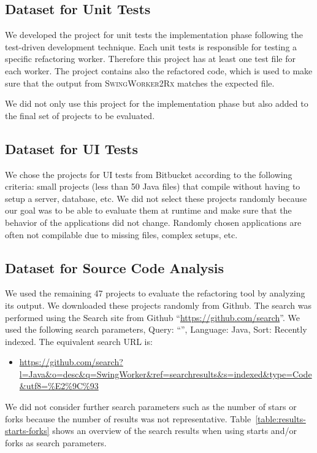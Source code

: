 \documentclass[type=bsc,accentcolor=tud9c]{tudthesis}
\newcommand{\framework}[1]{\textcolor{black!65}{#1}}
\newcommand{\toolextension}{\textsc{SwingWorker2Rx}}
\begin{document}
\subsection{Dataset for Unit Tests}
We developed the project for unit tests the implementation phase following the test-driven development technique. Each unit tests is responsible for testing a specific refactoring worker. Therefore this project has at least one test file for each worker. The project contains also the refactored code, which is used to make sure that the output from \toolextension{} matches the expected file.

We did not only use this project for the implementation phase but also added to the final set of projects to be evaluated.

\subsection{Dataset for UI Tests}
We chose the projects for UI tests from Bitbucket according to the following criteria: small projects (less than 50 \framework{Java} files) that compile without having to setup a server, database, etc. We did not select these projects randomly because our goal was to be able to evaluate them at runtime and make sure that the behavior of the applications did not change. Randomly chosen applications are often not compilable due to missing files, complex setups, etc.

\subsection{Dataset for Source Code Analysis}
We used the remaining 47 projects to evaluate the refactoring tool by analyzing its output. We downloaded these projects randomly from Github. The search was performed using the Search site from Github ``\url{https://github.com/search}''. We used the following search parameters, Query: ``'', Language: \framework{Java}, Sort: Recently indexed. The equivalent search URL is: 
\begin{itemize}
	\item \url{https://github.com/search?l=Java&o=desc&q=SwingWorker&ref=searchresults&s=indexed&type=Code&utf8=\%E2\%9C\%93}
\end{itemize}

We did not consider further search parameters such as the number of stars or forks because the number of results was not representative. Table~\ref{table:results-starts-forks} shows an overview of the search results when using starts and/or forks as search parameters.
\end{document}
